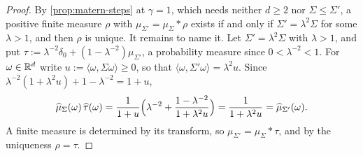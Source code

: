 \begin{proof}
\leanok
By \ref{prop:matern-steps} at $\gamma = 1$, which needs neither $d \ge 2$ nor $\Sigma \le \Sigma'$,
a positive finite measure $\rho$ with $\mu_{\Sigma'} = \mu_\Sigma * \rho$ exists if and only if
$\Sigma' = \lambda^2\Sigma$ for some $\lambda > 1$, and then $\rho$ is unique. It remains to name
it. Let $\Sigma' = \lambda^2\Sigma$ with $\lambda > 1$, and put
$\tau := \lambda^{-2}\delta_0 + (1-\lambda^{-2})\mu_{\Sigma'}$, a probability measure since
$0 < \lambda^{-2} < 1$. For $\omega \in \mathbb{R}^d$ write $u := \langle\omega,\Sigma\omega\rangle \ge 0$, so
that $\langle\omega,\Sigma'\omega\rangle = \lambda^2u$. Since
$\lambda^{-2}(1 + \lambda^2u) + 1 - \lambda^{-2} = 1 + u$,
\[
  \widehat\mu_\Sigma(\omega)\,\widehat\tau(\omega)
  = \frac{1}{1+u}\Bigl(\lambda^{-2} + \frac{1-\lambda^{-2}}{1+\lambda^2u}\Bigr)
  = \frac{1}{1+\lambda^2u} = \widehat\mu_{\Sigma'}(\omega) .
\]
A finite measure is determined by its transform, so $\mu_{\Sigma'} = \mu_\Sigma * \tau$, and by the
uniqueness $\rho = \tau$.
\end{proof}

